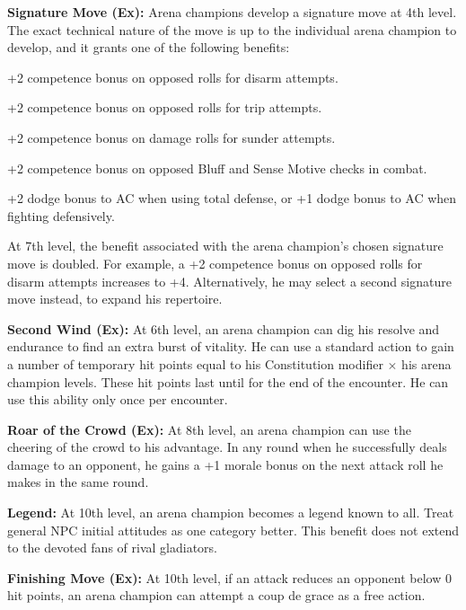 {\textbf{Signature Move (Ex):} Arena champions develop a signature move at 4th level. The exact technical nature of the move is up to the individual arena champion to develop, and it grants one of the following benefits:
\begin{itemize*}
\item +2 competence bonus on opposed rolls for disarm attempts.
\item +2 competence bonus on opposed rolls for trip attempts.
\item +2 competence bonus on damage rolls for sunder attempts.
\item +2 competence bonus on opposed Bluff and Sense Motive checks in combat.
\item +2 dodge bonus to AC when using total defense, or +1 dodge bonus to AC when fighting defensively.
\end{itemize*}

At 7th level, the benefit associated with the arena champion's chosen signature move is doubled. For example, a +2 competence bonus on opposed rolls for disarm attempts increases to +4. Alternatively, he may select a second signature move instead, to expand his repertoire.

\textbf{Second Wind (Ex):} At 6th level, an arena champion can dig his resolve and endurance to find an extra burst of vitality. He can use a standard action to gain a number of temporary hit points equal to his Constitution modifier $\times$ his arena champion levels. These hit points last until for the end of the encounter. He can use this ability only once per encounter.

\textbf{Roar of the Crowd (Ex):} At 8th level, an arena champion can use the cheering of the crowd to his advantage. In any round when he successfully deals damage to an opponent, he gains a +1 morale bonus on the next attack roll he makes in the same round.

\textbf{Legend:} At 10th level, an arena champion becomes a legend known to all. Treat general NPC initial attitudes as one category better. This benefit does not extend to the devoted fans of rival gladiators.

\textbf{Finishing Move (Ex):} At 10th level, if an attack reduces an opponent below 0 hit points, an arena champion can attempt a coup de grace as a free action.
}